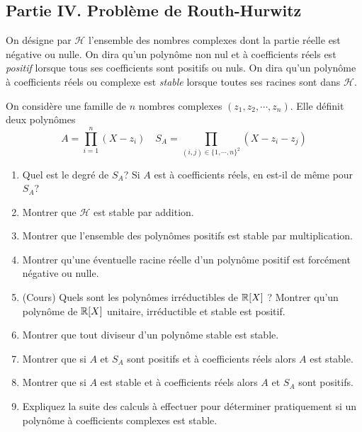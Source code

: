 \subsection*{Partie IV. Problème de Routh-Hurwitz}
On désigne par $\mathcal{H}$ l'ensemble des nombres complexes dont la partie réelle est négative ou nulle. On dira qu'un polynôme non nul et à coefficients réels est \emph{positif} lorsque tous ses coefficients sont positifs ou nuls. On dira qu'un polynôme à coefficients réels ou complexe est \emph{stable} lorsque toutes ses racines sont dans $\mathcal{H}$. \par On considère une famille
de $n$ nombres complexes $(z_1,z_2,\cdots,z_n)$. Elle définit deux polynômes
\begin{displaymath}
A=\prod_{i=1}^{n}(X-z_i) \quad S_A=\prod_{(i,j) \in \{1,\cdots,n\}^2} (X-z_i-z_j) 
\end{displaymath}
\begin{enumerate}
\item Quel est le degré de $S_A$? Si $A$ est à coefficients réels, en est-il de même pour $S_A$?
\item Montrer que $\mathcal{H}$ est stable par addition.
\item Montrer que l'ensemble des polynômes positifs est stable par multiplication.
\item Montrer qu'une éventuelle racine réelle d'un polynôme positif est forcément négative ou nulle.
\item (Cours) Quels sont les polynômes irréductibles de $\mathbb{R}[X]$ ?
Montrer qu'un polynôme de $\mathbb{R}[X]$ unitaire, irréductible et stable est positif.
\item Montrer que tout diviseur d'un polynôme stable est stable.
\item Montrer que si $A$ et $S_A$ sont positifs et à coefficients réels alors $A$ est stable.
\item Montrer que si $A$ est stable et à coefficients réels alors $A$ et $S_A$ sont positifs.
\item Expliquez la suite des calculs à effectuer pour déterminer pratiquement si un polynôme à coefficients complexes est stable.
\end{enumerate}
